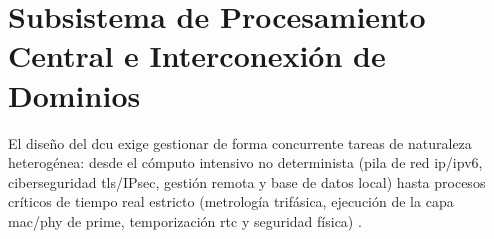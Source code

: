 

\section{Subsistema de Procesamiento Central e Interconexión de Dominios}
\label{sec:procesamiento_central}

El diseño del \gls{dcu} exige gestionar de forma concurrente tareas de naturaleza heterogénea: desde el cómputo intensivo no determinista (pila de red \gls{ip}/\gls{ipv6}, ciberseguridad \gls{tls}/IPsec, gestión remota y base de datos local) hasta procesos críticos de tiempo real estricto (metrología trifásica, ejecución de la capa \gls{mac}/\gls{phy} de \gls{prime}, temporización \gls{rtc} y seguridad física) \cite{7147624, 7778783}. 

